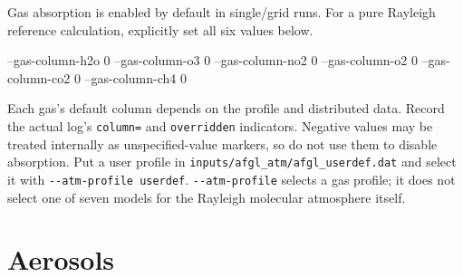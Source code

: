 Gas absorption is enabled by default in single/grid runs. For a pure Rayleigh reference calculation, explicitly set all six values below.


\begin{ManualCode}
--gas-column-h2o 0 --gas-column-o3 0 --gas-column-no2 0 --gas-column-o2 0 --gas-column-co2 0 --gas-column-ch4 0
\end{ManualCode}

Each gas's default column depends on the profile and distributed data. Record the actual log's \texttt{column=\allowbreak{}} and \texttt{overridden} indicators. Negative values may be treated internally as unspecified-value markers, so do not use them to disable absorption. Put a user profile in \texttt{inputs/\allowbreak{}afgl\_\allowbreak{}atm/\allowbreak{}afgl\_\allowbreak{}userdef.\allowbreak{}dat} and select it with \texttt{-\allowbreak{}-\allowbreak{}atm-\allowbreak{}profile userdef}. \texttt{-\allowbreak{}-\allowbreak{}atm-\allowbreak{}profile} selects a gas profile; it does not select one of seven models for the Rayleigh molecular atmosphere itself.

\section{Aerosols}
\label{sec:auto:03_options:4}



